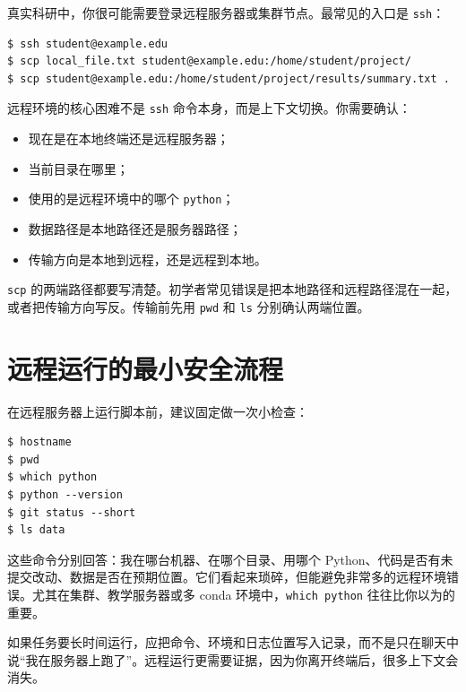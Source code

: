 真实科研中，你很可能需要登录远程服务器或集群节点。最常见的入口是 \texttt{ssh}：

\begin{examplebox}[远程登录与传输]
\begin{lstlisting}[style=terminal]
$ ssh student@example.edu
$ scp local_file.txt student@example.edu:/home/student/project/
$ scp student@example.edu:/home/student/project/results/summary.txt .
\end{lstlisting}
\end{examplebox}

远程环境的核心困难不是 \texttt{ssh} 命令本身，而是上下文切换。你需要确认：

\begin{itemize}
    \item 现在是在本地终端还是远程服务器；
    \item 当前目录在哪里；
    \item 使用的是远程环境中的哪个 \texttt{python}；
    \item 数据路径是本地路径还是服务器路径；
    \item 传输方向是本地到远程，还是远程到本地。
\end{itemize}

\begin{warnbox}[远程路径不要靠猜]
\texttt{scp} 的两端路径都要写清楚。初学者常见错误是把本地路径和远程路径混在一起，或者把传输方向写反。传输前先用 \texttt{pwd} 和 \texttt{ls} 分别确认两端位置。
\end{warnbox}

\section{远程运行的最小安全流程}

在远程服务器上运行脚本前，建议固定做一次小检查：

\begin{examplebox}[远程运行前检查]
\begin{lstlisting}[style=terminal]
$ hostname
$ pwd
$ which python
$ python --version
$ git status --short
$ ls data
\end{lstlisting}
\end{examplebox}

这些命令分别回答：我在哪台机器、在哪个目录、用哪个 Python、代码是否有未提交改动、数据是否在预期位置。它们看起来琐碎，但能避免非常多的远程环境错误。尤其在集群、教学服务器或多 conda 环境中，\texttt{which python} 往往比你以为的重要。

如果任务要长时间运行，应把命令、环境和日志位置写入记录，而不是只在聊天中说“我在服务器上跑了”。远程运行更需要证据，因为你离开终端后，很多上下文会消失。

